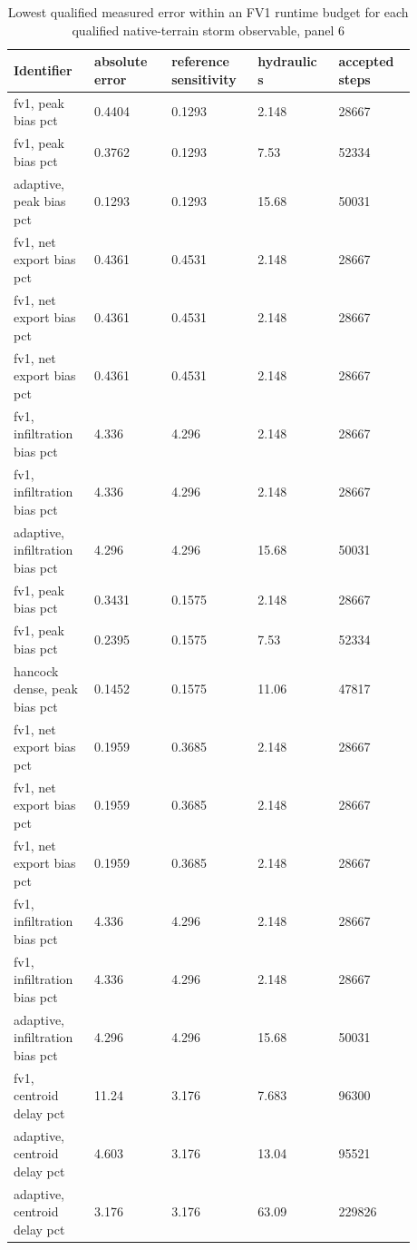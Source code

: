 \begin{longtable}{p{0.1760\linewidth}p{0.1760\linewidth}p{0.1760\linewidth}p{0.1760\linewidth}p{0.1760\linewidth}}
\caption{Lowest qualified measured error within an FV1 runtime budget for each qualified native-terrain storm observable, panel 6}\\
\hline
Identifier & absolute error & reference sensitivity & hydraulic s & accepted steps \\
\hline\endhead
fv1, peak bias pct & 0.4404 & 0.1293 & 2.148 & 28667 \\
fv1, peak bias pct & 0.3762 & 0.1293 & 7.53 & 52334 \\
adaptive, peak bias pct & 0.1293 & 0.1293 & 15.68 & 50031 \\
fv1, net export bias pct & 0.4361 & 0.4531 & 2.148 & 28667 \\
fv1, net export bias pct & 0.4361 & 0.4531 & 2.148 & 28667 \\
fv1, net export bias pct & 0.4361 & 0.4531 & 2.148 & 28667 \\
fv1, infiltration bias pct & 4.336 & 4.296 & 2.148 & 28667 \\
fv1, infiltration bias pct & 4.336 & 4.296 & 2.148 & 28667 \\
adaptive, infiltration bias pct & 4.296 & 4.296 & 15.68 & 50031 \\
fv1, peak bias pct & 0.3431 & 0.1575 & 2.148 & 28667 \\
fv1, peak bias pct & 0.2395 & 0.1575 & 7.53 & 52334 \\
hancock dense, peak bias pct & 0.1452 & 0.1575 & 11.06 & 47817 \\
fv1, net export bias pct & 0.1959 & 0.3685 & 2.148 & 28667 \\
fv1, net export bias pct & 0.1959 & 0.3685 & 2.148 & 28667 \\
fv1, net export bias pct & 0.1959 & 0.3685 & 2.148 & 28667 \\
fv1, infiltration bias pct & 4.336 & 4.296 & 2.148 & 28667 \\
fv1, infiltration bias pct & 4.336 & 4.296 & 2.148 & 28667 \\
adaptive, infiltration bias pct & 4.296 & 4.296 & 15.68 & 50031 \\
fv1, centroid delay pct & 11.24 & 3.176 & 7.683 & 96300 \\
adaptive, centroid delay pct & 4.603 & 3.176 & 13.04 & 95521 \\
adaptive, centroid delay pct & 3.176 & 3.176 & 63.09 & 229826 \\

\end{longtable}
